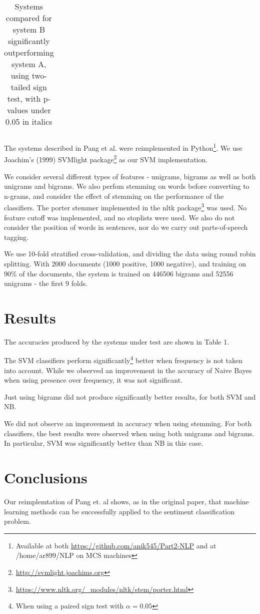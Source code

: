 \documentclass[12pt,a4paper]{article}
\begin{document}
\begin{multicols}{2}
\begin{table*}
\begin{tabular}{|l|l|l|}
  \end{tabular}
  \caption{Systems compared for system B significantly outperforming system A, using two-tailed sign test, with p-values under 0.05 in italics}
  \label{tab:significances}
\end{table*}

The systems described in Pang et al. were reimplemented in Python\footnote{Available at both \url{https://github.com/anik545/Part2-NLP} and at /home/ar899/NLP on MCS machines}. We use Joachim's (1999) SVMlight package\footnote{\url{http://svmlight.joachims.org}} as our SVM implementation.

We consider several different types of features - unigrams, bigrams as well as both unigrams and bigrams. We also perfom stemming on words before converting to n-grams, and consider the effect of stemming on the performance of the classifiers. The porter stemmer implemented in the nltk package\footnote{\url{https://www.nltk.org/_modules/nltk/stem/porter.html}} was used. No feature cutoff was implemented, and no stoplists were used. We also do not consider the position of words in sentences, nor do we carry out parts-of-speech tagging.


We use 10-fold stratified cross-validation, and dividing the data using round robin splitting. With 2000 documents (1000 positive, 1000 negative), and training on 90\% of the documents, the system is trained on 446506 bigrams and 52556 unigrams - the first 9 folds.

\section{Results}

The accuracies produced by the systems under test are shown in Table 1.

The SVM classifiers perform significantly\footnote{When using a paired sign test with $\alpha = 0.05$} better when frequency is not taken into account. While we observed an improvement in the accuracy of Naive Bayes when using presence over frequency, it was not significant.

Just using bigrams did not produce significantly better results, for both SVM and NB.

We did not observe an improvement in accuracy when using stemming. For both classifiers, the best results were observed when using both unigrams and bigrams. In particular, SVM was significantly better than NB in this case.

\section{Conclusions}

Our reimplemtation of Pang et. al shows, as in the original paper, that machine learning methods can be successfully applied to the sentiment classification problem.

\end{multicols}
\end{document}
